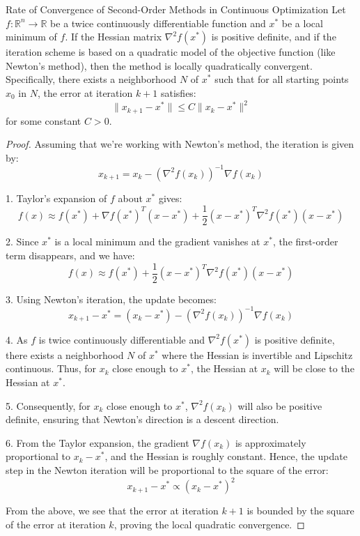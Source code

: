 \begin{theorem}{Rate of Convergence of Second-Order Methods in Continuous Optimization}{}
Let $ f: \mathbb{R}^n \rightarrow \mathbb{R} $ be a twice continuously differentiable function and $ x^* $ be a local minimum of $ f $. If the Hessian matrix $ \nabla^2 f(x^*) $ is positive definite, and if the iteration scheme is based on a quadratic model of the objective function (like Newton's method), then the method is locally quadratically convergent. Specifically, there exists a neighborhood $ N $ of $ x^* $ such that for all starting points $ x_0 $ in $ N $, the error at iteration $ k+1 $ satisfies:
\[
\| x_{k+1} - x^* \| \leq C \| x_k - x^* \|^2
\]
for some constant $ C > 0 $.
\end{theorem}

\begin{proof}
Assuming that we're working with Newton's method, the iteration is given by:
\[
x_{k+1} = x_k - \left( \nabla^2 f(x_k) \right)^{-1} \nabla f(x_k)
\]

1. Taylor's expansion of $ f $ about $ x^* $ gives:
\[
f(x) \approx f(x^*) + \nabla f(x^*)^T (x - x^*) + \frac{1}{2} (x - x^*)^T \nabla^2 f(x^*) (x - x^*)
\]

2. Since $ x^* $ is a local minimum and the gradient vanishes at $ x^* $, the first-order term disappears, and we have:
\[
f(x) \approx f(x^*) + \frac{1}{2} (x - x^*)^T \nabla^2 f(x^*) (x - x^*)
\]

3. Using Newton's iteration, the update becomes:
\[
x_{k+1} - x^* = (x_k - x^*) - \left( \nabla^2 f(x_k) \right)^{-1} \nabla f(x_k)
\]

4. As $ f $ is twice continuously differentiable and $ \nabla^2 f(x^*) $ is positive definite, there exists a neighborhood $ N $ of $ x^* $ where the Hessian is invertible and Lipschitz continuous. Thus, for $ x_k $ close enough to $ x^* $, the Hessian at $ x_k $ will be close to the Hessian at $ x^* $.

5. Consequently, for $ x_k $ close enough to $ x^* $, $ \nabla^2 f(x_k) $ will also be positive definite, ensuring that Newton's direction is a descent direction.

6. From the Taylor expansion, the gradient $ \nabla f(x_k) $ is approximately proportional to $ x_k - x^* $, and the Hessian is roughly constant. Hence, the update step in the Newton iteration will be proportional to the square of the error:
\[
x_{k+1} - x^* \propto (x_k - x^*)^2
\]

From the above, we see that the error at iteration $ k+1 $ is bounded by the square of the error at iteration $ k $, proving the local quadratic convergence.
\end{proof}


